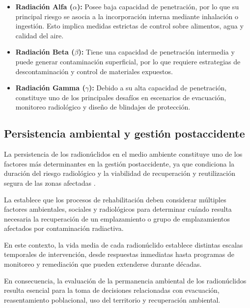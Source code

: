 \begin{itemize}

\item \textbf{Radiación Alfa ($\alpha$):} Posee baja capacidad de penetración, por lo que su principal riesgo se asocia a la incorporación interna mediante inhalación o ingestión. Esto implica medidas estrictas de control sobre alimentos, agua y calidad del aire.

\item \textbf{Radiación Beta ($\beta$):} Tiene una capacidad de penetración intermedia y puede generar contaminación superficial, por lo que requiere estrategias de descontaminación y control de materiales expuestos.

\item \textbf{Radiación Gamma ($\gamma$):} Debido a su alta capacidad de penetración, constituye uno de los principales desafíos en escenarios de evacuación, monitoreo radiológico y diseño de blindajes de protección.

\end{itemize}

\subsection{Persistencia ambiental y gestión postaccidente}

La persistencia de los radionúclidos en el medio ambiente constituye uno de los factores más determinantes en la gestión postaccidente, ya que condiciona la duración del riesgo radiológico y la viabilidad de recuperación y reutilización segura de las zonas afectadas \cite{IAEARemediation2007,IAEAFukushima2015}.

La \cite{IAEARemediation2007} establece que los procesos de rehabilitación deben considerar múltiples factores ambientales, sociales y radiológicos para determinar cuándo resulta necesaria la recuperación de un emplazamiento o grupo de emplazamientos afectados por contaminación radiactiva.

En este contexto, la vida media de cada radionúclido establece distintas escalas temporales de intervención, desde respuestas inmediatas hasta programas de monitoreo y remediación que pueden extenderse durante décadas.

En consecuencia, la evaluación de la permanencia ambiental de los radionúclidos resulta esencial para la toma de decisiones relacionadas con evacuación, reasentamiento poblacional, uso del territorio y recuperación ambiental.

